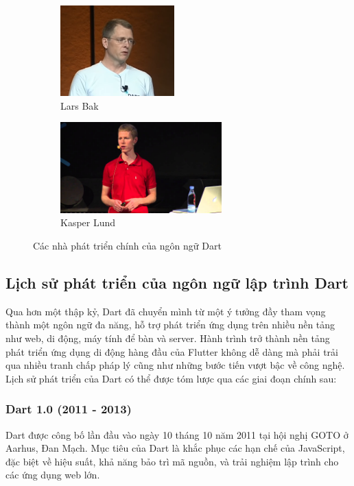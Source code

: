 \documentclass[../DoAn.tex]{subfiles}
\numberwithin{figure}{chapter}
\begin{document}
\begin{figure}[H]
    \centering
    \begin{subfigure}[b]{0.35\textwidth}
        \centering
        \includegraphics[width=\textwidth,height=3.5cm,keepaspectratio]{Hinhve/Lars_Bak.png}
        \caption{Lars Bak}
        \label{subfig:lars_bak}
    \end{subfigure}%
    \hspace{0.5cm} 
    \begin{subfigure}[b]{0.42\textwidth}
        \centering
        \includegraphics[width=\textwidth,height=3.5cm,keepaspectratio]{Hinhve/KasperLund.jpg}
        \caption{Kasper Lund}
        \label{subfig:kasper_lund}
    \end{subfigure}
    \caption{Các nhà phát triển chính của ngôn ngữ Dart}
    \label{fig:dart_developers}
\end{figure}

\subsection{Lịch sử phát triển của ngôn ngữ lập trình Dart}

Qua hơn một thập kỷ, Dart đã chuyển mình từ một ý tưởng đầy tham vọng thành một ngôn ngữ đa năng, hỗ trợ phát triển ứng dụng trên nhiều nền tảng như web, di động, máy tính để bàn và server. Hành trình trở thành nền tảng phát triển ứng dụng di động hàng đầu của Flutter không dễ dàng mà phải trải qua nhiều tranh chấp pháp lý cũng như những bước tiến vượt bậc về công nghệ. Lịch sử phát triển của Dart có thể được tóm lược qua các giai đoạn chính sau:

\subsubsection{Dart 1.0 (2011 - 2013)}
Dart được công bố lần đầu vào ngày 10 tháng 10 năm 2011 tại hội nghị GOTO ở Aarhus, Đan Mạch. Mục tiêu của Dart là khắc phục các hạn chế của JavaScript, đặc biệt về hiệu suất, khả năng bảo trì mã nguồn, và trải nghiệm lập trình cho các ứng dụng web lớn. 
\end{document}
